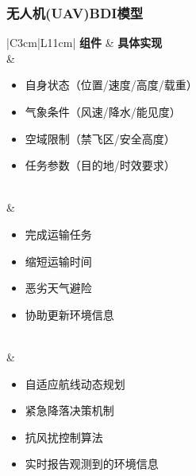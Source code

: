 \documentclass[12pt,a4paper]{article}
\begin{document}
\subsubsection{无人机(UAV)BDI模型}
\begin{table}[h]
	\centering
	\caption{无人机BDI模型}
	\label{tab:uav-bdi}
	\begin{tabular}{|C{3cm}|L{11cm}|}
		\hline
		\textbf{组件} & \textbf{具体实现} \\
		\hline
		 & 
		\begin{minipage}[t]{\linewidth}
			\begin{itemize}[leftmargin=*, nosep, topsep=0pt, itemsep=3pt]
				\item 自身状态（位置/速度/高度/载重）
				\item 气象条件（风速/降水/能见度）
				\item 空域限制（禁飞区/安全高度）
				\item 任务参数（目的地/时效要求）
			\end{itemize}
		\end{minipage} \\
		\hline
		 & 
		\begin{minipage}[t]{\linewidth}
			\begin{itemize}[leftmargin=*, nosep, topsep=0pt, itemsep=3pt]
				\item 完成运输任务
				\item 缩短运输时间
				\item 恶劣天气避险
				\item 协助更新环境信息
			\end{itemize}
		\end{minipage} \\
		\hline
		 & 
		\begin{minipage}[t]{\linewidth}
			\begin{itemize}[leftmargin=*, nosep, topsep=0pt, itemsep=3pt]
				\item 自适应航线动态规划
				\item 紧急降落决策机制
				\item 抗风扰控制算法
				\item 实时报告观测到的环境信息
			\end{itemize}
		\end{minipage} \\
		\hline
	\end{tabular}
\end{table}
\FloatBarrier
\end{document}
